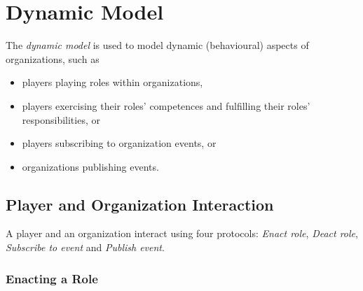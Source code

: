 
\section{Dynamic Model}

The \textit{dynamic model} is used to model dynamic (behavioural) aspects of organizations, such as
\begin{itemize}
	\item players playing roles within organizations,
	\item players exercising their roles' competences and fulfilling their roles' responsibilities, or
	\item players subscribing to organization events, or
	\item organizations publishing events.
\end{itemize}

\subsection{Player and Organization Interaction}

A player and an organization interact using four protocols: \textit{Enact role}, \textit{Deact role}, \textit{Subscribe to event} and \textit{Publish event}.

\subsubsection{Enacting a Role}

